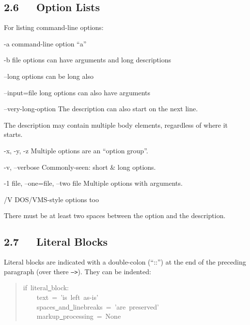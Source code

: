 \documentclass[10pt,a4paper,english]{article}
\newcommand{\optionlistlabel}[1]{\bf #1 \hfill}
\newenvironment{optionlist}[1]
{\begin{list}{}
  {\setlength{\labelwidth}{#1}
   \setlength{\rightmargin}{1cm}
   \setlength{\leftmargin}{\rightmargin}
   \addtolength{\leftmargin}{\labelwidth}
   \addtolength{\leftmargin}{\labelsep}
   \renewcommand{\makelabel}{\optionlistlabel}}
}{\end{list}}
\begin{document}

\hypertarget{option-lists}{}
\subsection*{2.6~~~Option Lists}

For listing command-line options:
\begin{optionlist}{3cm}
\item [-a]  
command-line option ``a''
\item [-b file]  
options can have arguments
and long descriptions
\item [--long]  
options can be long also
\item [--input=file]  
long options can also have
arguments
\item [--very-long-option]  
The description can also start on the next line.

The description may contain multiple body elements,
regardless of where it starts.
\item [-x, -y, -z]  
Multiple options are an ``option group''.
\item [-v, --verbose]  
Commonly-seen: short {\&} long options.
\item [-1 file, --one=file, --two file]  
Multiple options with arguments.
\item [/V]  
DOS/VMS-style options too
\end{optionlist}

There must be at least two spaces between the option and the
description.



\hypertarget{literal-blocks}{}
\subsection*{2.7~~~Literal Blocks}

Literal blocks are indicated with a double-colon (``::'') at the end of
the preceding paragraph (over there \texttt{-->}).  They can be indented:
\begin{quote}{\ttfamily \raggedright \noindent
if~literal{\underline{~}}block:~\\
~~~~text~=~'is~left~as-is'~\\
~~~~spaces{\underline{~}}and{\underline{~}}linebreaks~=~'are~preserved'~\\
~~~~markup{\underline{~}}processing~=~None
}\end{quote}
\end{document}
